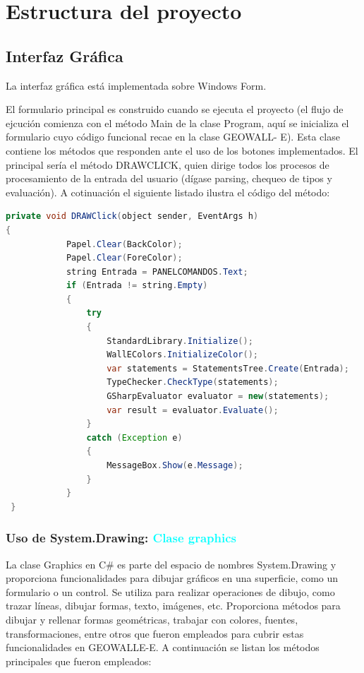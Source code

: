 \documentclass[a4paper, 12pt]{article}
\begin{document}
\newpage
\section{Estructura del proyecto}\label{}


\subsection{Interfaz Gráfica}\label{}
La interfaz gráfica está implementada sobre Windows Form.

El formulario principal es construido cuando se ejecuta el proyecto (el flujo de ejcución comienza con el método Main de la clase Program, aquí se inicializa el formulario cuyo código funcional recae en la clase GEOWALL- E). Esta clase contiene los métodos que responden ante el uso de los botones implementados. El principal sería el método DRAWCLICK, quien dirige todos los procesos de procesamiento de la entrada del usuario (dígase parsing, chequeo de tipos y evaluación). A cotinuación el siguiente listado ilustra el código del método:

\begin{lstlisting}[language= Java]
private void DRAWClick(object sender, EventArgs h)
{
            Papel.Clear(BackColor);
            Papel.Clear(ForeColor);
            string Entrada = PANELCOMANDOS.Text;
            if (Entrada != string.Empty)
            {
                try
                {
                    StandardLibrary.Initialize(); 
                    WallEColors.InitializeColor();
                    var statements = StatementsTree.Create(Entrada);
                    TypeChecker.CheckType(statements);
                    GSharpEvaluator evaluator = new(statements);
                    var result = evaluator.Evaluate();
                }
                catch (Exception e)
                {
                    MessageBox.Show(e.Message);
                }
            }
 }
\end{lstlisting}


\subsubsection{Uso de System.Drawing: \textcolor{cyan}{Clase graphics}}\label{}
La clase Graphics en C\# es parte del espacio de nombres System.Drawing y proporciona funcionalidades para dibujar gráficos en una superficie, como un formulario o un control. Se utiliza para realizar operaciones de dibujo, como trazar líneas, dibujar formas, texto, imágenes, etc.  Proporciona métodos para dibujar y rellenar formas geométricas, trabajar con colores, fuentes, transformaciones, entre otros que fueron empleados para cubrir estas funcionalidades en GEOWALLE-E. A continuación se listan los métodos principales que fueron empleados:
\end{document}
